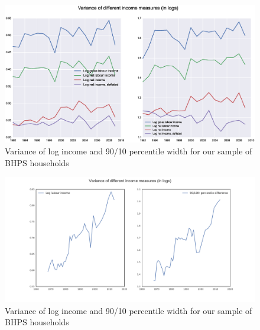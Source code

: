 \begin{figure}
\includegraphics[width=\columnwidth]{BHPS_incvar}
\caption{Variance of log income and 90/10 percentile width for our sample of
BHPS households}
\label{fig:bhps_incvar}
\end{figure}

\begin{figure}
\includegraphics[width=\columnwidth]{PSID_incvar}
\caption{Variance of log income and 90/10 percentile width for our sample of
BHPS households}
\label{fig:bhps_incvar}
\end{figure}


